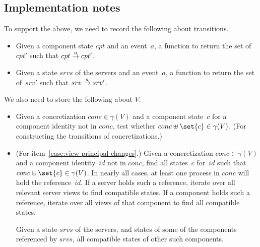 
\subsection{Implementation notes}

To support the above, we need to record the following about transitions.
%
\begin{itemize}
\item
Given a component state $cpt$ and an event~$a$, a function to return the set
of $cpt'$ such that $cpt \stackrel{a}\rightarrow cpt'$.

\item
Given a state $srvs$ of the servers and an event~$a$, a function to return the
set of~$srv'$ such that $srv \stackrel{a}\rightarrow srv'$.
\end{itemize}

We also need to store the following about $V$.
\begin{itemize}
\item
Given a concretization $conc \in \gamma(V)$ and a component state~$c$ for a
component identity not in $conc$, test whether $conc \uplus \set{c} \in
\gamma(V)$.  (For constructing the transitions of concretizations.)

\item (For item~\ref{case:view-principal-changes}.) Given a concretization
  $conc \in \gamma(V)$ and a component identity~$id$ not in $conc$, find all
  states~$c$ for~$id$ such that $conc \uplus \set{c} \in \gamma(V)$.  In
  nearly all cases, at least one process in $conc$ will hold the
  reference~$id$.  If a server holds such a reference, iterate over all
  relevant server views to find compatible states.  If a component holds such
  a reference, iterate over all views of that component to find all compatible
  states. 



Given a state $srvs$ of the servers, and states of some of the components
referenced by $srvs$, all compatible states of other such components.

\end{itemize}
